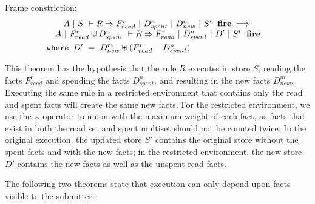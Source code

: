 % 

\begin{theorem}
Frame constriction:
$$
\begin{array}{c}
\jFire{A}{S}{R}{F_{read}^r}{D_{spent}^n}{D_{new}^m}{S'}
\implies \\
\quad \jFire{A}{F_{read}^r \Cup D_{spent}^n}{R}{F_{read}^r}{D_{spent}^n}{D'}{S'} \quad
\\[1ex]
\multicolumn{1}{l}{ \texttt{where } D' ~=~ D_{new}^m \uplus (F_{read}^r - D_{spent}^n)}
\\
\end{array}
$$
\end{theorem}

This theorem has the hypothesis that the rule $R$ executes in store $S$, reading the facts $F_{read}^r$ and spending the facts $D_{spent}^n$, and resulting in the new facts $D_{new}^m$.
Executing the same rule in a restricted environment that contains only the read and spent facts will create the same new facts.
For the restricted environment, we use the $\Cup$ operator to union with the maximum weight of each fact, as facts that exist in both the read set and spent multiset should not be counted twice.
In the original execution, the updated store $S'$ contains the original store without the spent facts and with the new facts; in the restricted environment, the new store $D'$ contains the new facts as well as the unspent read facts.


The following two theorems state that execution can only depend upon facts visible to the submitter:

